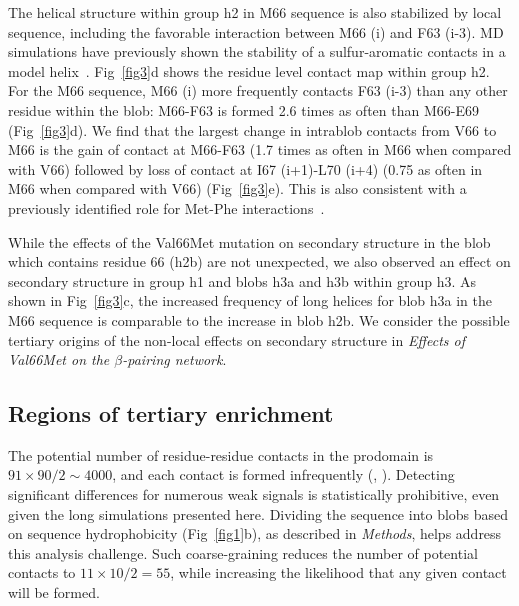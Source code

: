 \documentclass[10pt,letterpaper]{article}
\begin{document}
The helical structure within group h2 in M66 sequence is also stabilized by local sequence, including the favorable interaction between M66 (i) and F63 (i-3). MD simulations have previously shown the stability of a sulfur-aromatic contacts in a model helix~\cite{Viguera1995}. Fig~\ref{fig3}d shows the residue level contact map within group h2. For the M66 sequence, M66 (i) more frequently contacts F63 (i-3) than any other residue within the blob: M66-F63 is formed 2.6 times as often than M66-E69 (Fig~\ref{fig3}d). We find that the largest change in intrablob contacts from V66 to M66 is the gain of contact at M66-F63 (1.7 times as often in M66 when compared with V66) followed by loss of contact at I67 (i+1)-L70 (i+4) (0.75 as often in M66 when compared with V66) (Fig~\ref{fig3}e). This is also consistent with a previously identified role for Met-Phe interactions~\cite{Viguera1995,Faure2008,Valley2012,Gomez-Tamayo2016}.
 
While the effects of the Val66Met mutation on secondary structure in the blob which contains residue 66 (h2b) are not unexpected, we also observed an effect on secondary structure in group h1 and blobs h3a and h3b within group h3. As shown in Fig~\ref{fig3}c, the increased frequency of long helices for blob h3a in the M66 sequence is comparable to the increase in blob h2b. We consider the possible tertiary origins of the non-local effects on secondary structure in \emph{{\it Effects of Val66Met on the $\beta$-pairing network}}.

\subsection*{Regions of tertiary enrichment}
\label{sec:interdomain}

The potential number of residue-residue contacts in the prodomain is $91\times90/2\sim4000$, and each contact is formed infrequently (, ). Detecting significant differences for numerous weak signals is statistically prohibitive, even given the long simulations presented here. Dividing the sequence into blobs based on sequence hydrophobicity (Fig~\ref{fig1}b), as described in {\it Methods}, helps address this analysis challenge. Such coarse-graining reduces the number of potential contacts to $11\times10/2=55$, while increasing the likelihood that any given contact will be formed. 
\end{document}
